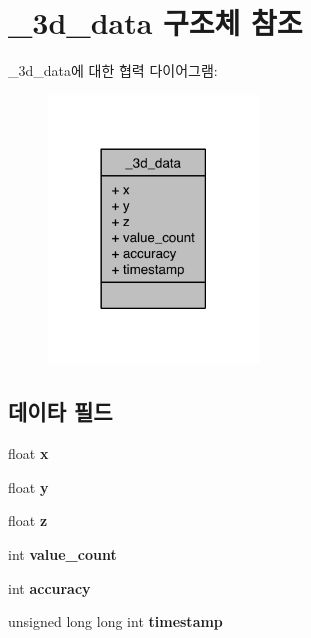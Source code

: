 \hypertarget{struct__3d__data}{\section{\-\_\-3d\-\_\-data 구조체 참조}
\label{struct__3d__data}
}


\-\_\-3d\-\_\-data에 대한 협력 다이어그램\-:\nopagebreak
\begin{figure}[H]
\begin{center}
\leavevmode
\includegraphics[width=158pt]{d9/dad/struct__3d__data__coll__graph}
\end{center}
\end{figure}
\subsection*{데이타 필드}
\begin{DoxyCompactItemize}
\item 
\hypertarget{struct__3d__data_ad0da36b2558901e21e7a30f6c227a45e}{float {\bfseries x}}\label{struct__3d__data_ad0da36b2558901e21e7a30f6c227a45e}

\item 
\hypertarget{struct__3d__data_aa4f0d3eebc3c443f9be81bf48561a217}{float {\bfseries y}}\label{struct__3d__data_aa4f0d3eebc3c443f9be81bf48561a217}

\item 
\hypertarget{struct__3d__data_af73583b1e980b0aa03f9884812e9fd4d}{float {\bfseries z}}\label{struct__3d__data_af73583b1e980b0aa03f9884812e9fd4d}

\item 
\hypertarget{struct__3d__data_a40a079bfc72408819dc78da308203a74}{int {\bfseries value\-\_\-count}}\label{struct__3d__data_a40a079bfc72408819dc78da308203a74}

\item 
\hypertarget{struct__3d__data_a5565cf9073275f9713f9016e7c10d25f}{int {\bfseries accuracy}}\label{struct__3d__data_a5565cf9073275f9713f9016e7c10d25f}

\item 
\hypertarget{struct__3d__data_a8de02c4128636a7bf630ff5428f60c8d}{unsigned long long int {\bfseries timestamp}}\label{struct__3d__data_a8de02c4128636a7bf630ff5428f60c8d}

\end{DoxyCompactItemize}


